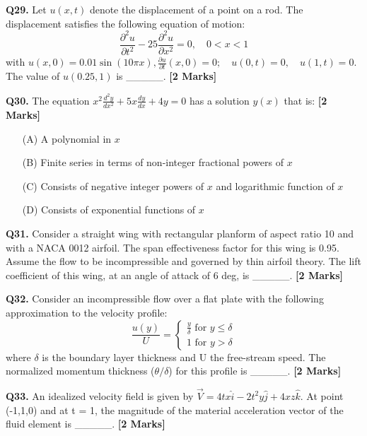 \documentclass[11pt]{article}
\newcommand{\questionb}[2]{
    \noindent\textbf{Q#2.} #1 \hfill \textbf{[2 Marks]}
}
\begin{document}
\vspace{0.5cm}

\questionb{Let $u(x,t)$ denote the displacement of a point on a rod. The displacement satisfies the following equation of motion:
\[
\frac{\partial^2 u}{\partial t^2} - 25 \frac{\partial^2 u}{\partial x^2} = 0, \quad 0 < x < 1
\]
with $u(x,0) = 0.01 \sin(10\pi x), \frac{\partial u}{\partial t}(x,0) = 0; \quad u(0,t) = 0, \quad u(1,t) = 0$. The value of $u(0.25,1)$ is \_\_\_\_\_.}{29}

\vspace{0.5cm}

\questionb{The equation $ x^2 \frac{d^2 y}{dx^2} + 5x \frac{dy}{dx} + 4y = 0 $ has a solution $y(x)$ that is:}{30}
\begin{enumerate}
    \item[(A)] A polynomial in $x$
    \item[(B)] Finite series in terms of non-integer fractional powers of $x$
    \item[(C)] Consists of negative integer powers of $x$ and logarithmic function of $x$
    \item[(D)] Consists of exponential functions of $x$
\end{enumerate}

\vspace{0.5cm}

\questionb{Consider a straight wing with rectangular planform of aspect ratio 10 and with a NACA 0012 airfoil. The span effectiveness factor for this wing is 0.95. Assume the flow to be incompressible and governed by thin airfoil theory. The lift coefficient of this wing, at an angle of attack of 6 deg, is \_\_\_\_\_.}{31}

\vspace{0.5cm}

\questionb{Consider an incompressible flow over a flat plate with the following approximation to the velocity profile:
\[
\frac{u(y)}{U} = 
\begin{cases} 
\frac{y}{\delta} \text{ for } y \leq \delta \\ 
1 \text{ for } y > \delta 
\end{cases}
\]
where $\delta$ is the boundary layer thickness and U the free-stream speed. The normalized momentum thickness ($\theta / \delta$) for this profile is \_\_\_\_\_.}{32}

\vspace{0.5cm}

\questionb{An idealized velocity field is given by $ \vec{V} = 4tx\hat{i} - 2t^2y\hat{j} + 4xz\hat{k} $. At point (-1,1,0) and at t = 1, the magnitude of the material acceleration vector of the fluid element is \_\_\_\_\_.}{33}
\end{document}
